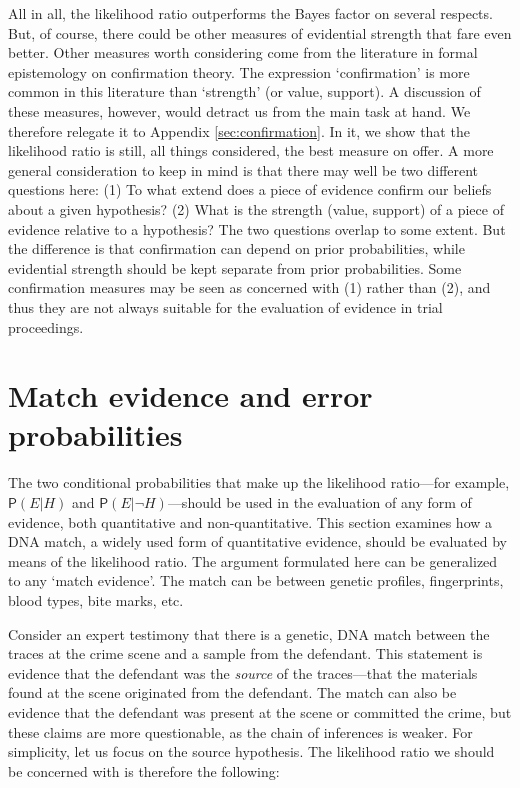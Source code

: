 \documentclass[
  letterpaper,
  DIV=11,
  numbers=noendperiod]{scrartcl}
\newcommand{\pr}[1]{\mathsf{P}(#1)}
\begin{document}
\normalsize

All in all, the likelihood ratio outperforms the Bayes factor on several
respects. But, of course, there could be other measures of evidential
strength that fare even better. Other measures worth considering come
from the literature in formal epistemology on confirmation theory. The
expression `confirmation' is more common in this literature than
`strength' (or value, support). A discussion of these measures, however,
would detract us from the main task at hand. We therefore relegate it to
Appendix \ref{sec:confirmation}. In it, we show that the likelihood
ratio is still, all things considered, the best measure on offer. A more
general consideration to keep in mind is that there may well be two
different questions here: (1) To what extend does a piece of evidence
confirm our beliefs about a given hypothesis? (2) What is the strength
(value, support) of a piece of evidence relative to a hypothesis? The
two questions overlap to some extent. But the difference is that
confirmation can depend on prior probabilities, while evidential
strength should be kept separate from prior probabilities. Some
confirmation measures may be seen as concerned with (1) rather than (2),
and thus they are not always suitable for the evaluation of evidence in
trial proceedings.

\hypertarget{match-evidence-and-error-probabilities}{%
\section{\texorpdfstring{Match evidence and error probabilities
\label{sec:fp}}{Match evidence and error probabilities }}\label{match-evidence-and-error-probabilities}}

The two conditional probabilities that make up the likelihood
ratio---for example, \(\pr{E \vert H}\) and
\(\pr{E \vert \neg H}\)---should be used in the evaluation of any form
of evidence, both quantitative and non-quantitative. This section
examines how a DNA match, a widely used form of quantitative evidence,
should be evaluated by means of the likelihood ratio. The argument
formulated here can be generalized to any `match evidence'. The match
can be between genetic profiles, fingerprints, blood types, bite marks,
etc.

Consider an expert testimony that there is a genetic, DNA match between
the traces at the crime scene and a sample from the defendant. This
statement is evidence that the defendant was the \textit{source} of the
traces---that the materials found at the scene originated from the
defendant. The match can also be evidence that the defendant was present
at the scene or committed the crime, but these claims are more
questionable, as the chain of inferences is weaker. For simplicity, let
us focus on the source hypothesis. The likelihood ratio we should be
concerned with is therefore the following:
\end{document}
